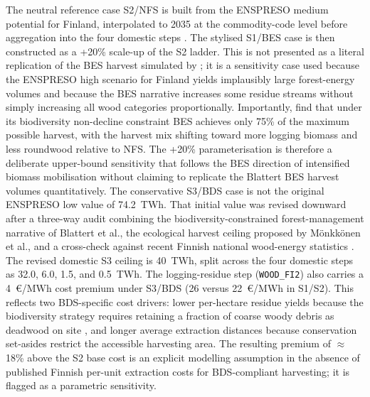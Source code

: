 \documentclass{article}
\begin{document}
The neutral reference case S2/NFS is built from the ENSPRESO medium potential for Finland, interpolated to 2035 at the commodity-code level before aggregation into the four domestic steps \citep{ruizENSPRESOOpenEU282019}. The stylised S1/BES case is then constructed as a +20\% scale-up of the S2 ladder. This is not presented as a literal replication of the BES harvest simulated by \cite{blattertSectoralPoliciesCause2022}; it is a sensitivity case used because the ENSPRESO high scenario for Finland yields implausibly large forest-energy volumes and because the BES narrative increases some residue streams without simply increasing all wood categories proportionally. Importantly, \citet{blattertSectoralPoliciesCause2022} find that under its biodiversity non-decline constraint BES achieves only 75\% of the maximum possible harvest, with the harvest mix shifting toward more logging biomass and less roundwood relative to NFS. The +20\% parameterisation is therefore a deliberate upper-bound sensitivity that follows the BES direction of intensified biomass mobilisation without claiming to replicate the Blattert BES harvest volumes quantitatively. The conservative S3/BDS case is not the original ENSPRESO low value of 74.2~TWh. That initial value was revised downward after a three-way audit combining the biodiversity-constrained forest-management narrative of Blattert et al., the ecological harvest ceiling proposed by M\"onkk\"onen et al., and a cross-check against recent Finnish national wood-energy statistics \citep{blattertSectoralPoliciesCause2022,monkkonenEcologicallyEconomicallySustainable2024,lukeWoodEnergy2024}. The revised domestic S3 ceiling is 40~TWh, split across the four domestic steps as 32.0, 6.0, 1.5, and 0.5~TWh. The logging-residue step (\texttt{WOOD\_FI2}) also carries a 4~€/MWh cost premium under S3/BDS (26 versus 22~€/MWh in S1/S2). This reflects two BDS-specific cost drivers: lower per-hectare residue yields because the biodiversity strategy requires retaining a fraction of coarse woody debris as deadwood on site \citep{blattertSectoralPoliciesCause2022,monkkonenEcologicallyEconomicallySustainable2025}, and longer average extraction distances because conservation set-asides restrict the accessible harvesting area. The resulting premium of $\approx$18\% above the S2 base cost is an explicit modelling assumption in the absence of published Finnish per-unit extraction costs for BDS-compliant harvesting; it is flagged as a parametric sensitivity.
\end{document}
